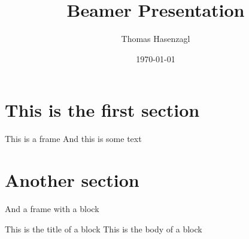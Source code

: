 \documentclass[xcolor=svgnames,compress]{beamer}
\author{Thomas Hasenzagl}
\title{Beamer Presentation}
\date{\today}
\begin{document}
\maketitle 

\section{This is the first section}

\begin{frame}{This is a frame}
    And this is some text
\end{frame}

\section{Another section}

\begin{frame}{And a frame with a block}
    \begin{block}{This is the title of a block}
    This is the body of a block 
    \end{block}
\end{frame}
\end{document}
